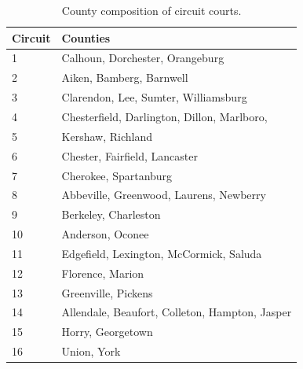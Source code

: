 \documentclass[11pt, oneside]{article}   	%
\newcommand{\rowgroup}[1]{\hspace{-1em}#1}
\theoremstyle{ModifiedStyle}
\begin{document}
\begin{table}[H]
	\centering
	\caption{County composition of circuit courts.} 
	\vspace{0mm}
	\setlength\tabcolsep{8pt} %
	{\footnotesize
		\begin{tabular}{C{10mm}L{70mm}}
			\toprule
			Circuit & Counties  \\
			\midrule
			1 & Calhoun, Dorchester, Orangeburg \\
			2 & Aiken, Bamberg, Barnwell \\
			3 & Clarendon, Lee, Sumter, Williamsburg \\
			4 & Chesterfield, Darlington, Dillon, Marlboro,  \\
			5 & Kershaw, Richland \\
			6 & Chester, Fairfield, Lancaster \\
			7 & Cherokee, Spartanburg \\
			8 & Abbeville, Greenwood, Laurens, Newberry  \\
			9 & Berkeley, Charleston \\
			10 & Anderson, Oconee \\
			11 & Edgefield, Lexington, McCormick, Saluda  \\
			12 & Florence, Marion \\
			13 & Greenville, Pickens \\
			14 & Allendale, Beaufort, Colleton, Hampton, Jasper \\
			15 & Horry, Georgetown \\
			16 & Union, York \\
			\bottomrule
		\end{tabular}
	}
	\label{Table_Circuit_Court_Counties}
\end{table}
\end{document}
